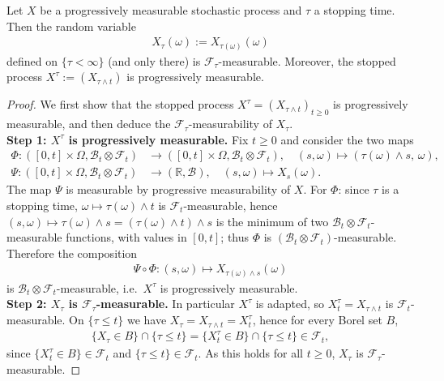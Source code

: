 \begin{proposition}
	Let $X$ be a progressively measurable stochastic process and $\tau$ a stopping time. Then the random variable
	\begin{align*}
		X_\tau(\omega) := X_{\tau(\omega)}(\omega)
	\end{align*}
	defined on $\{\tau < \infty\}$ (and only there) is $\mathcal{F}_\tau$-measurable. Moreover, the stopped process $X^\tau := (X_{\tau \wedge t})$ is progressively measurable.
\end{proposition}
\begin{proof}
	We first show that the stopped process $X^\tau = (X_{\tau \wedge t})_{t \ge 0}$ is progressively measurable, and then deduce the $\mathcal{F}_\tau$-measurability of $X_\tau$.\\
	\textbf{Step 1: $X^\tau$ is progressively measurable.} Fix $t \ge 0$ and consider the two maps
	\begin{align*}
		\Phi: ([0,t] \times \Omega, \mathcal{B}_t \otimes \mathcal{F}_t) &\to ([0,t] \times \Omega, \mathcal{B}_t \otimes \mathcal{F}_t), \quad (s, \omega) \mapsto (\tau(\omega) \wedge s,\, \omega),\\
		\Psi: ([0,t] \times \Omega, \mathcal{B}_t \otimes \mathcal{F}_t) &\to (\mathbb{R}, \mathcal{B}), \quad (s, \omega) \mapsto X_s(\omega).
	\end{align*}
	The map $\Psi$ is measurable by progressive measurability of $X$. For $\Phi$: since $\tau$ is a stopping time, $\omega \mapsto \tau(\omega) \wedge t$ is $\mathcal{F}_t$-measurable, hence $(s, \omega) \mapsto \tau(\omega) \wedge s = (\tau(\omega) \wedge t) \wedge s$ is the minimum of two $\mathcal{B}_t \otimes \mathcal{F}_t$-measurable functions, with values in $[0, t]$; thus $\Phi$ is $(\mathcal{B}_t \otimes \mathcal{F}_t)$-measurable. Therefore the composition
	\begin{align*}
		\Psi \circ \Phi : (s, \omega) \mapsto X_{\tau(\omega) \wedge s}(\omega)
	\end{align*}
	is $\mathcal{B}_t \otimes \mathcal{F}_t$-measurable, i.e.\ $X^\tau$ is progressively measurable.\\
	\textbf{Step 2: $X_\tau$ is $\mathcal{F}_\tau$-measurable.} In particular $X^\tau$ is adapted, so $X_t^\tau = X_{\tau \wedge t}$ is $\mathcal{F}_t$-measurable. On $\{\tau \le t\}$ we have $X_\tau = X_{\tau \wedge t} = X_t^\tau$, hence for every Borel set $B$,
	\begin{align*}
		\{X_\tau \in B\} \cap \{\tau \le t\} = \{X_t^\tau \in B\} \cap \{\tau \le t\} \in \mathcal{F}_t,
	\end{align*}
	since $\{X_t^\tau \in B\} \in \mathcal{F}_t$ and $\{\tau \le t\} \in \mathcal{F}_t$. As this holds for all $t \ge 0$, $X_\tau$ is $\mathcal{F}_\tau$-measurable.
\end{proof}

